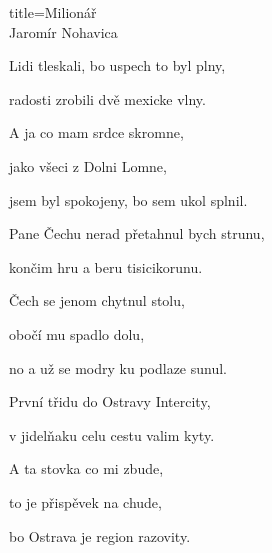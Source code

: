 \begin{song}{title=\centering Milionář \\\normalsize Jaromír Nohavica  \vspace*{-0.3cm}}
{\begin{minipage}[t]{0.5\textwidth}
\sloka 
Lidi tleskali, bo uspech to byl plny, 

radosti zrobili dvě mexicke vlny. 

A ja co mam srdce skromne, 

jako všeci z Dolni Lomne, 

jsem byl spokojeny, bo sem ukol splnil. 

\sloka
Pane Čechu nerad přetahnul bych strunu, 

končim hru a beru tisicikorunu. 

Čech se jenom chytnul stolu, 

obočí mu spadlo dolu, 

no a už se modry ku podlaze sunul. 

\sloka
První třidu do Ostravy Intercity, 

v jidelňaku celu cestu valim kyty.

A ta stovka co mi zbude, 

to je přispěvek na chude, 

bo Ostrava je region razovity.


\end{minipage}
}
\setcounter{Slokočet}{0}
\end{song}
